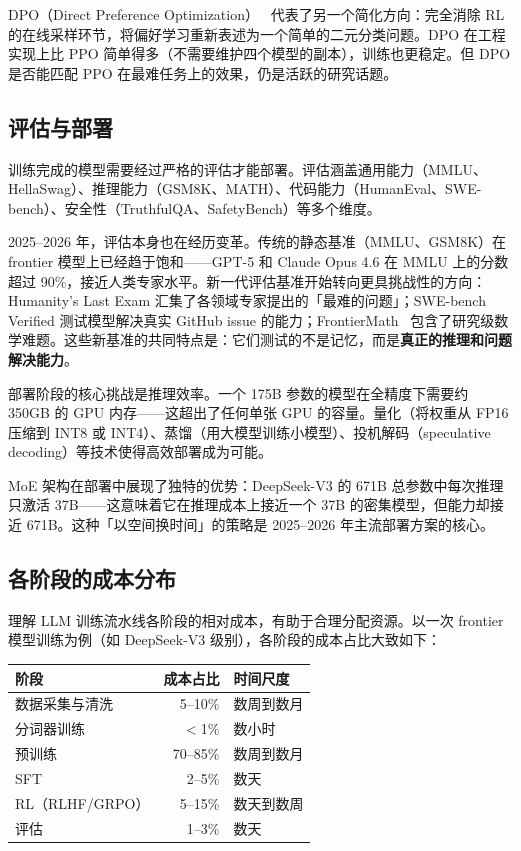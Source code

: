 DPO（Direct Preference Optimization）~\cite{rafailov2023dpo} 代表了另一个简化方向：完全消除 RL 的在线采样环节，将偏好学习重新表述为一个简单的二元分类问题。DPO 在工程实现上比 PPO 简单得多（不需要维护四个模型的副本），训练也更稳定。但 DPO 是否能匹配 PPO 在最难任务上的效果，仍是活跃的研究话题。

\subsection{评估与部署}

训练完成的模型需要经过严格的评估才能部署。评估涵盖通用能力（MMLU、HellaSwag）、推理能力（GSM8K、MATH）、代码能力（HumanEval、SWE-bench）、安全性（TruthfulQA、SafetyBench）等多个维度。

2025--2026 年，评估本身也在经历变革。传统的静态基准（MMLU、GSM8K）在 frontier 模型上已经趋于饱和——GPT-5 和 Claude Opus 4.6 在 MMLU 上的分数超过 90\%，接近人类专家水平。新一代评估基准开始转向更具挑战性的方向：Humanity's Last Exam 汇集了各领域专家提出的「最难的问题」；SWE-bench Verified 测试模型解决真实 GitHub issue 的能力；FrontierMath~\cite{glazer2024frontiermath} 包含了研究级数学难题。这些新基准的共同特点是：它们测试的不是记忆，而是\textbf{真正的推理和问题解决能力}。

部署阶段的核心挑战是推理效率。一个 175B 参数的模型在全精度下需要约 350GB 的 GPU 内存——这超出了任何单张 GPU 的容量。量化（将权重从 FP16 压缩到 INT8 或 INT4）、蒸馏（用大模型训练小模型）、投机解码（speculative decoding）等技术使得高效部署成为可能。

MoE 架构在部署中展现了独特的优势：DeepSeek-V3 的 671B 总参数中每次推理只激活 37B——这意味着它在推理成本上接近一个 37B 的密集模型，但能力却接近 671B。这种「以空间换时间」的策略是 2025--2026 年主流部署方案的核心。

\subsection{各阶段的成本分布}

理解 LLM 训练流水线各阶段的相对成本，有助于合理分配资源。以一次 frontier 模型训练为例（如 DeepSeek-V3 级别），各阶段的成本占比大致如下：

\begin{center}
\small
\begin{tabular}{lrl}
\hline
\textbf{阶段} & \textbf{成本占比} & \textbf{时间尺度} \\
\hline
数据采集与清洗    & 5--10\%   & 数周到数月 \\
分词器训练        & $<$1\%    & 数小时 \\
预训练            & 70--85\%  & 数周到数月 \\
SFT               & 2--5\%    & 数天 \\
RL（RLHF/GRPO）   & 5--15\%   & 数天到数周 \\
评估              & 1--3\%    & 数天 \\
\hline
\end{tabular}
\end{center}

